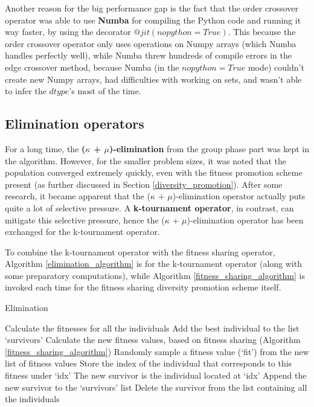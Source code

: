 \documentclass[a4paper,10pt]{article}
\newcommand{\ReplaceMe}[1]{{\color{blue}#1}}
\begin{document}
Another reason for the big performance gap is the fact that the order crossover operator was able to use \textbf{Numba} for compiling the Python code and running it way faster, by using the decorator $@jit(nopython=True)$. This because the order crossover operator only uses operations on Numpy arrays (which Numba handles perfectly well), while Numba threw hundreds of compile errors in the edge crossover method, because Numba (in the $nopython=True$ mode) couldn't create new Numpy arrays, had difficulties with working on sets, and wasn't able to infer the $dtype$'s most of the time.


\subsection{Elimination operators}
\label{elimination}
For a long time, the \textbf{($\kappa$ + $\mu$)-elimination} from the group phase part was kept in the algorithm. However, for the smaller problem sizes, it was noted that the population converged extremely quickly, even with the fitness promotion scheme present (as further discussed in Section \ref{diversity_promotion}). After some research, it became apparent that the ($\kappa$ + $\mu$)-elimination operator actually puts quite a lot of selective pressure. A \textbf{k-tournament operator}, in contrast, can mitigate this selective pressure, hence the ($\kappa$ + $\mu$)-elimination operator has been exchanged for the k-tournament operator.

To combine the k-tournament operator with the fitness sharing operator, Algorithm \ref{elimination_algorithm} is for the k-tournament operator (along with some preparatory computations), while Algorithm \ref{fitness_sharing_algorithm} is invoked each time for the fitness sharing diversity promotion scheme itself.

\begin{algorithm}
\caption{Elimination \cite{eiben_smith}}\label{elimination_algorithm}
\begin{algorithmic}
\State Calculate the fitnesses for all the individuals
\State Add the best individual to the list `survivors'
\State Calculate the new fitness values, based on fitness sharing (Algorithm \ref{fitness_sharing_algorithm})
\State Randomly sample a fitness value (`fit') from the new list of fitness values
\State Store the index of the individual that corresponds to this fitness under `idx'
\EndIf
\EndFor
\State The new survivor is the individual located at `idx'
\State Append the new survivor to the `survivors' list
\State Delete the survivor from the list containing all the individuals
\EndFor
\end{algorithmic}
\end{algorithm}
\end{document}
